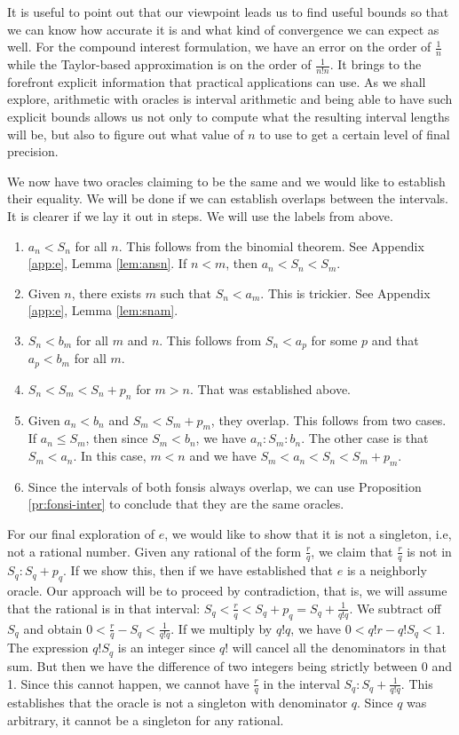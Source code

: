 \documentclass[12pt]{article}
\begin{document}
It is useful to point out that our viewpoint leads us to find useful bounds so that we can know how accurate it is and what kind of convergence we can expect as well. For the compound interest formulation, we have an error on the order of $\frac{1}{n}$ while the Taylor-based approximation is on the order of $\frac{1}{n! n}$. It brings to the forefront explicit information that practical applications can use. As we shall explore, arithmetic with oracles is interval arithmetic and being able to have such explicit bounds allows us not only to compute what the resulting interval lengths will be, but also to figure out what value of $n$ to use to get a certain level of final precision. 

We now have two oracles claiming to be the same and we would like to establish their equality. We will be done if we can establish overlaps between the intervals. It is clearer if we lay it out in steps. We will use the labels from above. 
\begin{enumerate}
    \item $a_n < S_n$ for all $n$. This follows from the binomial theorem. See Appendix \ref{app:e}, Lemma \ref{lem:ansn}. If $n < m$, then $a_n < S_n < S_m$.
    \item Given $n$, there exists $m$ such that $S_n < a_m$. This is trickier. See Appendix \ref{app:e}, Lemma \ref{lem:snam}. 
    \item $S_n < b_m$ for all $m$ and $n$. This follows from $S_n < a_p$ for some $p$ and that $a_p < b_m$ for all $m$.
    \item $S_n < S_m < S_n + p_n$ for $m > n$. That was established above. 
    \item Given $a_n < b_n$ and $S_m < S_m + p_m$, they overlap. This follows from two cases. If $a_n \leq S_m$, then since $S_m < b_n$, we have $a_n : S_m : b_n$. The other case is that $S_m < a_n$. In this case, $m < n$ and we have $S_m < a_n < S_n < S_m + p_m$. 
    \item Since the intervals of both fonsis always overlap, we can use Proposition \ref{pr:fonsi-inter} to conclude that they are the same oracles. 
\end{enumerate}

For our final exploration of $e$, we would like to show that it is not a singleton, i.e, not a rational number. Given any rational of the form $\frac{r}{q}$, we claim that $\frac{r}{q}$ is not in $S_q : S_q + p_q$. If we show this, then if we have established that $e$ is a neighborly oracle. Our approach will be to proceed by contradiction, that is, we will assume that the rational is in that interval:  $S_q < \tfrac{r}{q} <  S_q + p_q = S_q + \frac{1}{q!q}$. We subtract off $S_q$ and obtain $0 < \tfrac{r}{q} - S_q < \tfrac{1}{q! q}$. If we multiply by $q! q$, we have $0 < q! r - q!S_q < 1$.  The expression $q! S_q$ is an integer since $q!$ will cancel all the denominators in that sum. But then we have the difference of two integers being strictly between 0 and 1. Since this cannot happen, we cannot have $\tfrac{r}{q}$ in the interval $S_q : S_q + \frac{1}{q! q}$. This establishes that the oracle is not a singleton with denominator $q$. Since $q$ was arbitrary, it cannot be a singleton for any rational. 
\end{document}
